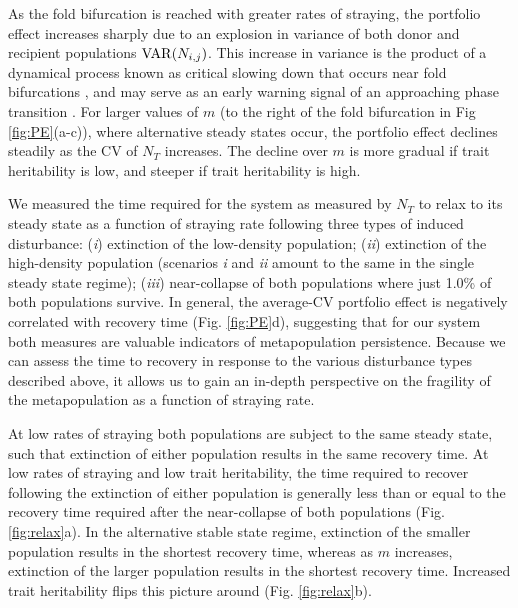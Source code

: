 \documentclass[twocolumn,preprintnumbers,amsmath,amssymb,superscriptaddress]{revtex4}
\begin{document}


As the fold bifurcation is reached with greater rates of straying, the portfolio effect increases sharply due to an explosion in variance of both donor and recipient populations ${\rm VAR}(N_{i,j})$.
This increase in variance is the product of a dynamical process known as critical slowing down that occurs near fold bifurcations \cite{Scheffer:2009gg}, and may serve as an early warning signal of an approaching phase transition \cite{Scheffer:2009gg,Anonymous:2013br,Dakos:2014br}.
For larger values of $m$ (to the right of the fold bifurcation in Fig \ref{fig:PE}(a-c)), where alternative steady states occur, the portfolio effect declines steadily as the CV of $N_T$ increases.
The decline over $m$ is more gradual if trait heritability is low, and steeper if trait heritability is high.



We measured the time required for the system as measured by $N_T$ to relax to its steady state as a function of straying rate following three types of induced disturbance: (\emph{i}) extinction of the low-density population; (\emph{ii}) extinction of the high-density population (scenarios \emph{i} and \emph{ii} amount to the same in the single steady state regime); (\emph{iii}) near-collapse of both populations where just 1.0\% of both populations survive.
In general, the average-CV portfolio effect is negatively correlated with recovery time (Fig. \ref{fig:PE}d), suggesting that for our system both measures are valuable indicators of metapopulation persistence.
Because we can assess the time to recovery in response to the various disturbance types described above, it allows us to gain an in-depth perspective on the fragility of the metapopulation as a function of straying rate.

At low rates of straying both populations are subject to the same steady state, such that extinction of either population results in the same recovery time.
At low rates of straying and low trait heritability, the time required to recover following the extinction of either population is generally less than or equal to the recovery time required after the near-collapse of both populations (Fig. \ref{fig:relax}a).
In the alternative stable state regime, extinction of the smaller population results in the shortest recovery time, whereas as $m$ increases, extinction of the larger population results in the shortest recovery time.
Increased trait heritability flips this picture around (Fig. \ref{fig:relax}b).
\end{document}
